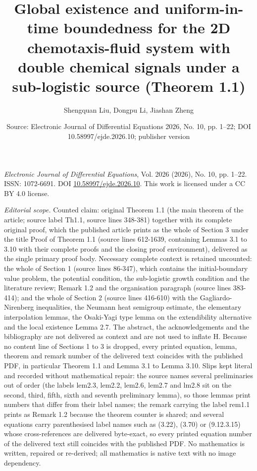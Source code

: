 \documentclass[10pt,a4paper]{amsart}
\title[Existence and boundedness of the classical global solution to 2D chemotaxis-fluid system with double chemical signals]{Global existence and uniform-in-time boundedness for the 2D chemotaxis-fluid system with double chemical signals under a sub-logistic source (Theorem 1.1)}
\author{Shengquan Liu, Dongpu Li, Jiashan Zheng}
\date{Source: Electronic Journal of Differential Equations 2026, No. 10, pp. 1--22; DOI 10.58997/ejde.2026.10; publisher version}
\numberwithin{equation}{section}
\begin{document}
\maketitle
\noindent\emph{Electronic Journal of Differential Equations}, Vol. 2026 (2026), No. 10, pp. 1--22.\newline
ISSN: 1072-6691. DOI \href{https://doi.org/10.58997/ejde.2026.10}{10.58997/ejde.2026.10}. This work is licensed under a CC BY 4.0 license.\par\smallskip
\noindent\textit{Editorial scope.} Counted claim: original Theorem 1.1 (the main theorem of the article; source label Th1.1, source lines 348-381) together with its complete original proof, which the published article prints as the whole of Section 3 under the title Proof of Theorem 1.1 (source lines 612-1639, containing Lemmas 3.1 to 3.10 with their complete proofs and the closing proof environment), delivered as the single primary proof body. Necessary complete context is retained uncounted: the whole of Section 1 (source lines 86-347), which contains the initial-boundary value problem, the potential condition, the sub-logistic growth condition and the literature review; Remark 1.2 and the organisation paragraph (source lines 383-414); and the whole of Section 2 (source lines 416-610) with the Gagliardo-Nirenberg inequalities, the Neumann heat semigroup estimate, the elementary interpolation lemmas, the Osaki-Yagi type lemma on the extendibility alternative and the local existence Lemma 2.7. The abstract, the acknowledgements and the bibliography are not delivered as context and are not used to inflate H. Because no content line of Sections 1 to 3 is dropped, every printed equation, lemma, theorem and remark number of the delivered text coincides with the published PDF, in particular Theorem 1.1 and Lemma 3.1 to Lemma 3.10. Slips kept literal and recorded without mathematical repair: the source names several preliminaries out of order (the labels lem2.3, lem2.2, lem2.6, lem2.7 and lm2.8 sit on the second, third, fifth, sixth and seventh preliminary lemma), so those lemmas print numbers that differ from their label names; the remark carrying the label rem1.1 prints as Remark 1.2 because the theorem counter is shared; and several equations carry parenthesised label names such as (3.22), (3.70) or (9.12.3.15) whose cross-references are delivered byte-exact, so every printed equation number of the delivered text still coincides with the published PDF. No mathematics is written, repaired or re-derived; all mathematics is native text with no image dependency.
\end{document}
